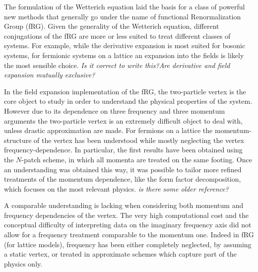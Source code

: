 
The formulation of the Wetterich equation\cite{Wetterich1993} laid the basis for a class of powerful new methods that generally go under the name of functional Renormalization Group (fRG).\cite{Metzner2012,Berges2002}
 Given the generality of the Wetterich equation, different conjugations of the fRG are more or less suited to treat different classes of systems. 
For example, while the derivative expansion is most suited for bosonic systems, for fermionic systems on a lattice an expansion into the fields is likely the most sensible choice.
\emph{Is it correct to write this?Are derivative and field expansion mutually exclusive?} 

In the field expansion implementation of the fRG, the two-particle vertex is the core object %
 to study in order to understand the physical properties of the system. 
However due to its dependence on three frequency and three momentum arguments the two-particle vertex is an extremely difficult object to deal with, unless drastic approximation are made. 
 For fermions on a lattice the momentum-structure of the vertex has been understood while mostly neglecting the vertex frequency-dependence.
In particular, the first results have been obtained using the $N$-patch scheme,\cite{Zanchi1996,Halboth2000,Halboth2000b,Honerkamp2001} in which all momenta are treated on the same footing.
Once an understanding was obtained this way, it was possible to tailor more refined treatments of the momentum dependence, like the form factor decomposition, which focuses on the most relevant physics.\cite{Husemann2009,Eberlein2016}
\emph{is there some older reference?}

A comparable understanding is lacking when considering both momentum and frequency dependencies of the vertex.
The very high computational cost and the conceptual difficulty of interpreting data on the imaginary frequency axis did not allow for a frequency treatment comparable to the momentum one.
Indeed in fRG (for lattice models), frequency has been either completely neglected, by assuming a static vertex, or treated in approximate schemes\cite{Husemann2012} which capture part of the physics only.

